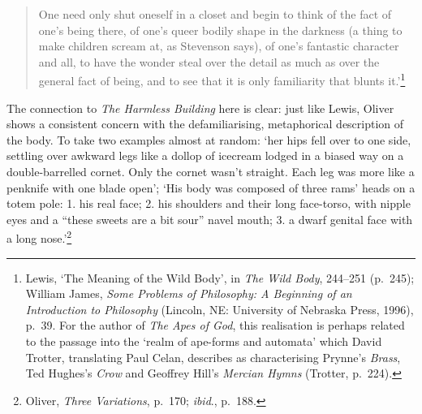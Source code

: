 \documentclass[]{article}
\begin{document}
\begin{quote}
\singlespacing One need only shut oneself in a closet and begin to think
of the fact of one’s being there, of one’s queer bodily shape in the
darkness (a thing to make children scream at, as Stevenson says), of
one’s fantastic character and all, to have the wonder steal over the
detail as much as over the general fact of being, and to see that it is
only familiarity that blunts it.’\footnote{Lewis, ‘The Meaning of the
  Wild Body’, in \emph{The Wild Body}, 244–251 (p.~245); William James,
  \emph{Some Problems of Philosophy: A Beginning of an Introduction to
  Philosophy} (Lincoln, NE: University of Nebraska Press, 1996), p.~39.
  For the author of \emph{The Apes of God}, this realisation is perhaps
  related to the passage into the ‘realm of ape-forms and automata’
  which David Trotter, translating Paul Celan, describes as
  characterising Prynne’s \emph{Brass}, Ted Hughes’s \emph{Crow} and
  Geoffrey Hill’s \emph{Mercian Hymns} (Trotter, p.~224).}
\end{quote}

\noindent The connection to \emph{The Harmless Building} here is clear:
just like Lewis, Oliver shows a consistent concern with the
defamiliarising, metaphorical description of the body. To take two
examples almost at random: ‘her hips fell over to one side, settling
over awkward legs like a dollop of icecream lodged in a biased way on a
double-barrelled cornet. Only the cornet wasn’t straight. Each leg was
more like a penknife with one blade open’; ‘His body was composed of
three rams’ heads on a totem pole: 1. his real face; 2. his shoulders
and their long face-torso, with nipple eyes and a “these sweets are a
bit sour” navel mouth; 3. a dwarf genital face with a long
nose.’\footnote{Oliver, \emph{Three Variations}, p.~170; \emph{ibid}.,
  p.~188.}
\end{document}
